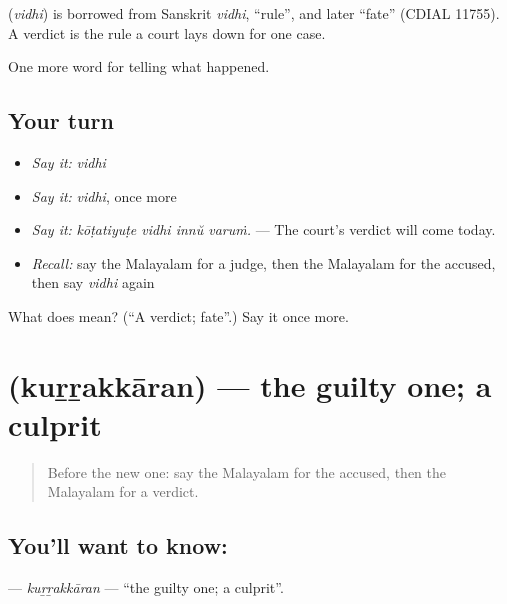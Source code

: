 \begin{cousinweb}
\textbf{} (\emph{vidhi}) is borrowed from Sanskrit \emph{vidhi}, \textquotedblleft{}rule\textquotedblright{}, and later \textquotedblleft{}fate\textquotedblright{} (CDIAL 11755). A verdict is the rule a court lays down for one case.
\end{cousinweb}

\begin{grammarlens}[title={What you've built}]
One more word for telling what happened.
\end{grammarlens}

\subsection*{Your turn}
\begin{itemize}
\raggedright
  \item \emph{Say it:} \emph{vidhi}
  \item \emph{Say it:} \emph{vidhi}, once more
  \item \emph{Say it:} \emph{kōṭatiyuṭe vidhi innŭ varuṁ.} — The court's verdict will come today.
  \item \emph{Recall:} say the Malayalam for a judge, then the Malayalam for the accused, then say \emph{vidhi} again
\end{itemize}

\begin{tcolorbox}[breakable,colback=teal!4,colframe=teal!35!black,title={Before you move on}]
What does  mean? (\textquotedblleft{}A verdict; fate\textquotedblright{}.) Say it once more.
\end{tcolorbox}
\section[\texorpdfstring{\ml{കുറ്റക്കാരൻ} (kuṟṟakkāran)}{കുറ്റക്കാരൻ (kuṟṟakkāran)}]{ (kuṟṟakkāran) — the guilty one; a culprit}

\label{lesson:ML-C369-kurrakkaran}



\begin{quote}
Before the new one: say the Malayalam for the accused, then the Malayalam for a verdict.
\end{quote}

\subsection*{You'll want to know: }
\textbf{} — \emph{kuṟṟakkāran} — \textquotedblleft{}the guilty one; a culprit\textquotedblright{}.

